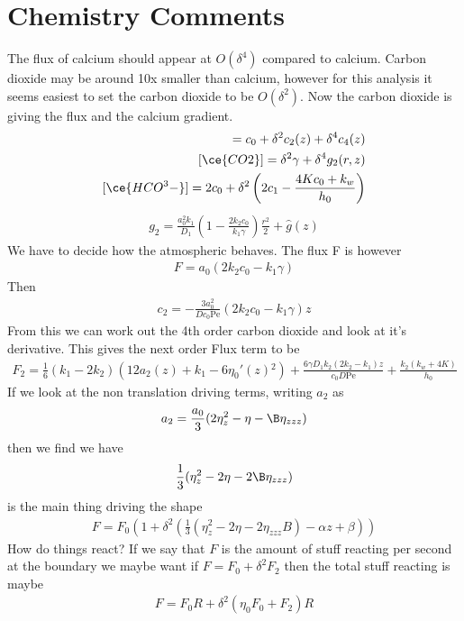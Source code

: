 \documentclass[12pt]{article}
\newcommand{\Pe}{\mathrm{Pe}}
\begin{document}
\section{Chemistry Comments}
The flux of calcium should appear at $O(\delta^4)$ compared to calcium. Carbon dioxide may be around 10x smaller than calcium, however for this analysis it seems easiest to set the carbon dioxide to be $O(\delta^2)$. Now the carbon dioxide is giving the flux and the calcium gradient.
\begin{align}
[\ce{Ca^2+}] = c_0 + \delta^2 c_2(z) + \delta^4 c_4(z)\\
[\ce{CO2}]= \delta^2 \gamma+\delta^4 g_2(r,z)\\
[\ce{HCO^3-}]= 2c_0 +\delta^2\left(2 c_1 - \frac{4Kc_0+k_w}{h_0}\right)
\end{align}
\begin{align}
g_2 =\frac{a_0^2k_1}{D_1} \left(1-\frac{2k_2c_0}{k_1\gamma}\right)\frac{r^2}{2} + \hat g(z)
\end{align}
We have to decide how the atmospheric  behaves. The flux F is however
\begin{align}
F = a_0\left(2k_2c_0-k_1\gamma\right)
\end{align}
Then 
\begin{align}
c_2 = -\frac{3a_0^2}{Dc_0\Pe}\left(2k_2 c_0 - k_1\gamma\right)z
\end{align}
From this we can work out the 4th order carbon dioxide and look at it's derivative.
This gives the next order Flux term to be 
\begin{align}
F_2 = \frac{1}{6} \left(k_1-2 k_2\right) \left(12 a_2(z)+k_1-6 \eta _0'(z){}^2\right)+\frac{6
	\gamma  D_1 k_2 \left(2 k_2-k_1\right) z}{c_0 D \text{Pe}}+\frac{k_2 \left(k_w+4
	K\right)}{h_0}
\end{align}
If we look at the non translation driving terms, writing $a_2$ as
	\begin{align}
a_2 = \frac{a_0}{3}(2\eta_z^2-\eta -\B \eta_{zzz})
\end{align}   
then we find
we have
\begin{align}
\frac{1}{3}(\eta_z^2-2\eta-2\B\eta_{zzz}) 
\end{align}
is the main thing driving the shape
\begin{align}
F = F_0(1+\delta^2(\frac{1}{3}(\eta_z^2-2\eta-2\eta_{zzz}B)-\alpha z + \beta))
\end{align}
How do things react?
If we say that $F$ is the amount of stuff reacting per second at the boundary
we maybe want if $F = F_0 + \delta^2 F_2$ then the total stuff reacting is maybe 
\begin{align}
 F = F_0 R  + \delta^2(\eta_0 F_0 + F_2)R
\end{align}


\end{document}
